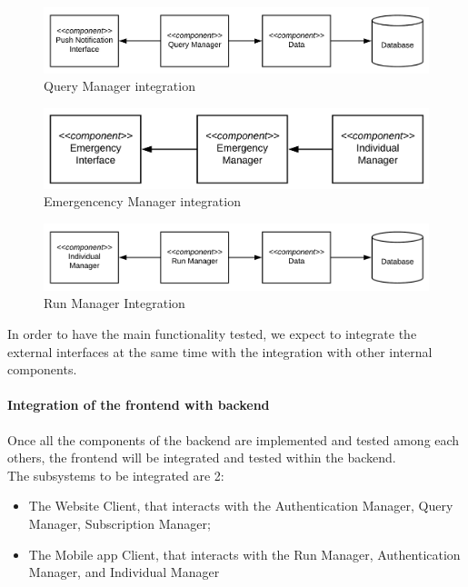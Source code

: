 \begin{figure}[H]
	\includegraphics[width=\textwidth,height=\textheight,keepaspectratio]{assets/integration/QueryPush.pdf}
	\caption{Query Manager integration}
	\label{fig:QueryPush}
\end{figure}



\begin{figure}[H]
	\includegraphics[width=\textwidth,height=\textheight,keepaspectratio]{assets/integration/EmergencyIndividual.pdf}
	\caption{Emergencency Manager integration}
	\label{fig:EmergencyIndividual}
\end{figure}


\begin{figure}[H]
	\includegraphics[width=\textwidth,height=\textheight,keepaspectratio]{assets/integration/IndividualRun.pdf}
	\caption{Run Manager Integration}
	\label{fig:IndividualRun}
\end{figure}

\noindent In order to have the main functionality tested, we expect to integrate the external interfaces at the same time with the integration with other internal components.




\paragraph{Integration of the frontend with backend}
Once all the components of the backend are implemented and tested among each others, the frontend will be integrated and tested within the backend. \\
The subsystems to be integrated are 2:
\begin{itemize}
    \item The Website Client, that interacts with the Authentication Manager, Query Manager, Subscription Manager;
    \item The Mobile app Client, that interacts with the Run Manager, Authentication Manager, and Individual Manager
\end{itemize}


